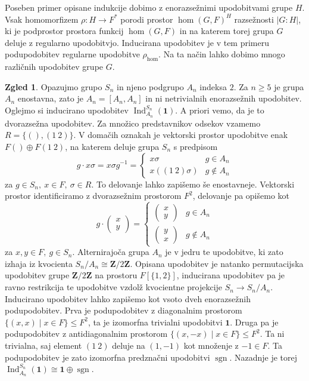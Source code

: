 \documentclass[11pt]{book}
\def\ZZ{\mathbf{Z}}
\def\11{\mathbf{1}}
\DeclareMathOperator\sgn{sgn}
\DeclareMathOperator\Ind{Ind}
\theoremstyle{definition}
\theoremstyle{zgled}
\newtheorem*{zgled}{Zgled}
\theoremstyle{odprtproblem}
\theoremstyle{domacanaloga}
\theoremstyle{izrek}
\begin{document}
Poseben primer opisane indukcije dobimo z enorazsežnimi upodobitvami grupe $H$. Vsak homomorfizem $\rho \colon H \to F^*$ porodi prostor $\hom(G,F)^H$ razsežnosti $|G:H|$, ki je podprostor prostora funkcij $\hom(G,F)$ in na katerem torej grupa $G$ deluje z regularno upodobitvjo. Inducirana upodobitev je v tem primeru podupodobitev regularne upodobitve $\rho_{\hom}$. Na ta način lahko dobimo mnogo različnih upodobitev grupe $G$.

\begin{zgled}
    Opazujmo grupo $S_n$ in njeno podgrupo $A_n$ indeksa $2$. Za $n \geq 5$ je grupa $A_n$ enostavna, zato je $A_n = [A_n, A_n]$ in ni netrivialnih enorazsežnih upodobitev. Oglejmo si inducirano upodobitev $\Ind^{S_n}_{A_n}(\11)$. A priori vemo, da je to dvorazsežna upodobitev. Za množico predstavnikov odsekov vzamemo $R = \{ (), (1 \ 2) \}$. V domačih oznakah je vektorski prostor upodobitve enak $F ()\oplus F (1 \ 2)$, na katerem deluje grupa $S_n$ s predpisom
    \[
        g \cdot x \sigma = x \sigma g^{-1} = \begin{cases}
            x \sigma   & g \in A_n \\
            x \left((1 \ 2)\sigma\right)    & g \notin A_n
        \end{cases}
    \]
    za $g \in S_n, \ x \in F, \ \sigma \in R$. To delovanje lahko zapišemo še enostavneje. Vektorski prostor identificiramo z dvorazsežnim prostorom $F^2$, delovanje pa opišemo kot
    \[
        g \cdot \begin{pmatrix}
            x \\ y
        \end{pmatrix} =
        \begin{cases}
            \begin{pmatrix}
                x \\ y
            \end{pmatrix} & g \in A_n \\
            \begin{pmatrix}
                y \\ x
            \end{pmatrix} & g \notin A_n
        \end{cases}
    \]
    za $x,y \in F, \ g \in S_n$. Alternirajoča grupa $A_n$ je v jedru te upodobitve, ki zato izhaja iz kvocienta $S_n/A_n \cong \ZZ/2\ZZ$. Opisana upodobitev je natanko permutacijska upodobitev grupe $\ZZ/2\ZZ$ na prostoru $F[\{ 1, 2 \}]$, inducirana upodobitev pa je ravno restrikcija te upodobitve vzdolž kvocientne projekcije $S_n \to S_n/A_n$. Inducirano upodobitev lahko zapišemo kot vsoto dveh enorazsežnih podupodobitev. Prva je podupodobitev z diagonalnim prostorom $\{ (x,x) \mid x \in F \} \leq F^2$, ta je izomorfna trivialni upodobitvi $\11$. Druga pa je podupodobitev z antidiagonalnim prostorom $\{ (x, -x) \mid x \in F \} \leq F^2$. Ta ni trivialna, saj element $(1 \ 2)$ deluje na $(1, -1)$ kot množenje z $-1 \in F$. Ta podupodobitev je zato izomorfna predznačni upodobitvi $\sgn$. Nazadnje je torej $\Ind^{S_n}_{A_n}(\11) \cong \11 \oplus \sgn$.
\end{zgled}
\end{document}
